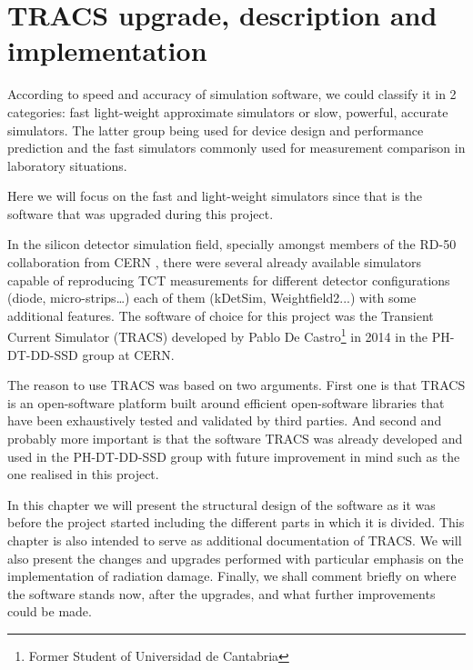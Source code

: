 \clearpage
{}  %
\chapter{TRACS upgrade, description and implementation}
\label{chap:tracs}

According to speed and accuracy of simulation software, we could classify it in 2 categories: fast light-weight approximate simulators or slow, powerful, accurate simulators. The latter group being used for device design and performance prediction and the fast simulators commonly used for measurement comparison in laboratory situations.

Here we will focus on the fast and light-weight simulators since that is the software that was upgraded during this project. 

In the silicon detector simulation field, specially amongst members of the RD-50 collaboration from CERN \cite{RD50}, there were several already available simulators capable of reproducing TCT measurements for different detector configurations (diode, micro-strips\ldots) each of them (kDetSim, Weightfield2...) with some additional features. The software of choice for this project was the Transient Current Simulator (TRACS) developed by Pablo De Castro\footnote{Former Student of Universidad de Cantabria} in 2014 in the PH-DT-DD-SSD group at CERN. 

The reason to use TRACS was based on two arguments. First one is that TRACS is an open-software platform built around efficient open-software libraries that have been exhaustively tested and validated by third parties. And second and probably more important is that the software TRACS was already developed and used in the PH-DT-DD-SSD group with future improvement in mind such as the one realised in this project.

In this chapter we will present the structural design of the software as it was before the project started including the different parts in which it is divided. This chapter is also intended to serve as additional documentation of TRACS. We will also present the changes and upgrades performed with particular emphasis on the implementation of radiation damage. Finally, we shall comment briefly on where the software stands now, after the upgrades, and what further improvements could be made.

